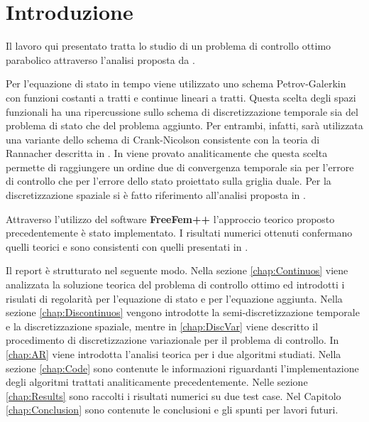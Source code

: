 \section{Introduzione}
Il lavoro qui presentato tratta lo studio di un problema di controllo ottimo parabolico attraverso l'analisi proposta da \cite{MAIN}.
\par\medskip
Per l'equazione di stato in tempo viene utilizzato uno schema Petrov-Galerkin con funzioni costanti a tratti e  continue lineari a tratti. Questa scelta degli spazi funzionali ha una ripercussione sullo schema di discretizzazione temporale sia del problema di stato che del problema aggiunto. Per entrambi, infatti, sarà utilizzata una variante dello schema di Crank-Nicolson consistente con la teoria di Rannacher descritta in \cite{Ran84}.
In \cite{MAIN} viene provato analiticamente che questa scelta permette di raggiungere un ordine due di convergenza temporale sia per l'errore di controllo che per l'errore dello stato proiettato sulla griglia duale.
Per la discretizzazione spaziale si è fatto riferimento all'analisi proposta in \cite{MV11}.
\par\medskip
Attraverso l'utilizzo del software \textbf{FreeFem++} l'approccio teorico proposto precedentemente è stato implementato. I risultati numerici ottenuti confermano quelli teorici e sono consistenti con quelli presentati in \cite{MAIN}. %
\par\medskip
Il report è strutturato nel seguente modo. Nella sezione \ref{chap:Continuos} viene analizzata la soluzione teorica del problema di controllo ottimo ed introdotti i risulati di regolarità per l'equazione di stato e per l'equazione aggiunta. Nella sezione \ref{chap:Discontinuos} vengono introdotte la semi-discretizzazione temporale e la discretizzazione spaziale, mentre in \ref{chap:DiscVar} viene descritto il procedimento di discretizzazione variazionale per il problema di controllo. In \ref{chap:AR} viene introdotta l'analisi teorica per i due algoritmi studiati. Nella sezione \ref{chap:Code} sono contenute le informazioni riguardanti l'implementazione degli algoritmi trattati analiticamente precedentemente. Nelle sezione \ref{chap:Results} sono raccolti i risultati numerici su due test case. Nel Capitolo \ref{chap:Conclusion} sono contenute le conclusioni e gli spunti per lavori futuri.